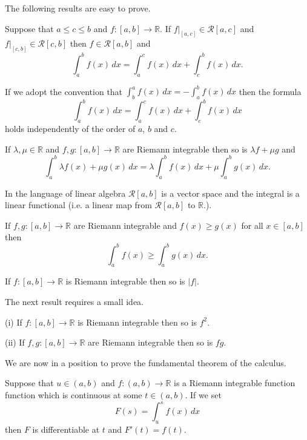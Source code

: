The following results are easy to prove.
\begin{lemma} Suppose that $a\leq c\leq b$ and
$f:[a,b]\rightarrow{\mathbb R}$. 
If $f|_{[a,c]}\in{\mathcal R}[a,c]$ and
$f|_{[c,b]}\in{\mathcal R}[c,b]$ then
$f\in{\mathcal R}[a,b]$ and
\[\int_{a}^{b}f(x)\,dx=\int_{a}^{c}f(x)\,dx
+\int_{c}^{b}f(x)\,dx .\]
\end{lemma}
If we adopt the convention that 
$\int_{b}^{a}f(x)\,dx=-\int_{a}^{b}f(x)\,dx$
then the formula
\[\int_{a}^{b}f(x)\,dx=\int_{a}^{c}f(x)\,dx
+\int_{c}^{b}f(x)\,dx \]
holds independently of the order of $a$, $b$ and $c$.
\begin{lemma}\label{add Riemann} 
If $\lambda,\mu\in{\mathbb R}$ and
$f,g:[a,b]\rightarrow{\mathbb R}$ are
Riemann integrable then so is $\lambda f+\mu g$
and 
\[\int_{a}^{b}\lambda f(x)+\mu g(x)\,dx
=\lambda\int_{a}^{b}f(x)\,dx+\mu \int_{a}^{b}g(x)\,dx.\]
\end{lemma}
In the language of linear algebra ${\mathcal R}[a,b]$
is a vector space and the integral is a linear functional
(i.e. a linear map from ${\mathcal R}[a,b]$ to
${\mathbb R}$.). 
\begin{lemma} If $f,g:[a,b]\rightarrow{\mathbb R}$ are
Riemann integrable and $f(x)\geq g(x)$ for all $x\in [a,b]$
then 
\[\int_{a}^{b}f(x)\geq \int_{a}^{b}g(x)\,dx.\]
\end{lemma}
\begin{lemma} If $f:[a,b]\rightarrow{\mathbb R}$ is
Riemann integrable then so is $|f|$.
\end{lemma}
The next result requires
a small idea.
\begin{lemma} (i) If $f:[a,b]\rightarrow{\mathbb R}$ is
Riemann integrable then so is $f^{2}$.

(ii) If $f,g:[a,b]\rightarrow{\mathbb R}$ are
Riemann integrable then so is $fg$.
\end{lemma}  

We are now in a position to prove the fundamental
theorem of the calculus.
\begin{theorem}
Suppose that $u\in (a,b)$ and
$f:(a,b)\rightarrow{\mathbb R}$ is a
Riemann integrable function function which is
continuous at some $t\in(a,b)$. If we set
\[F(s)=\int_{u}^{s}f(x)\,dx\]
then $F$ is differentiable at $t$ and $F'(t)=f(t)$.
\end{theorem}

